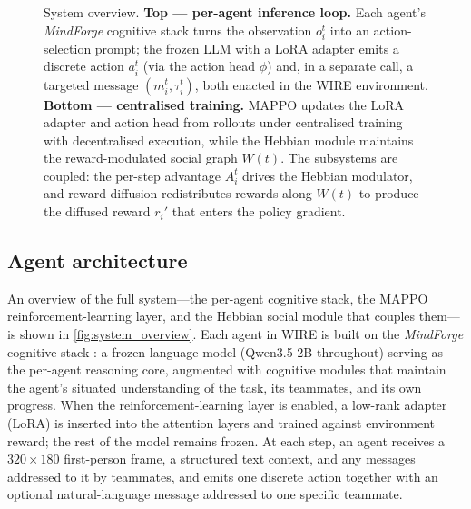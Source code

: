 \begin{figure}[t]
\caption{System overview. \textbf{Top --- per-agent inference loop.} Each agent's \emph{MindForge} cognitive stack turns the observation $o_i^t$ into an action-selection prompt; the frozen LLM with a LoRA adapter emits a discrete action $a_i^t$ (via the action head $\phi$) and, in a separate call, a targeted message $(m_i^t,\tau_i^t)$, both enacted in the WIRE environment. \textbf{Bottom --- centralised training.} MAPPO updates the LoRA adapter and action head from rollouts under centralised training with decentralised execution, while the Hebbian module maintains the reward-modulated social graph $W(t)$. The subsystems are coupled: the per-step advantage $A_i^t$ drives the Hebbian modulator, and reward diffusion redistributes rewards along $W(t)$ to produce the diffused reward $r_i'$ that enters the policy gradient.}
\label{fig:system_overview}
\end{figure}

\subsection{Agent architecture}
\label{sec:agent_architecture}

An overview of the full system---the per-agent cognitive stack, the MAPPO reinforcement-learning layer, and the Hebbian social module that couples them---is shown in \autoref{fig:system_overview}. Each agent in WIRE is built on the \emph{MindForge} cognitive stack \cite{licua2025mindforge}: a frozen language model (Qwen3.5-2B throughout) serving as the per-agent reasoning core, augmented with cognitive modules that maintain the agent's situated understanding of the task, its teammates, and its own progress. When the reinforcement-learning layer is enabled, a low-rank adapter (LoRA) \cite{hu2022lora} is inserted into the attention layers and trained against environment reward; the rest of the model remains frozen. At each step, an agent receives a $320 \times 180$ first-person frame, a structured text context, and any messages addressed to it by teammates, and emits one discrete action together with an optional natural-language message addressed to one specific teammate.

